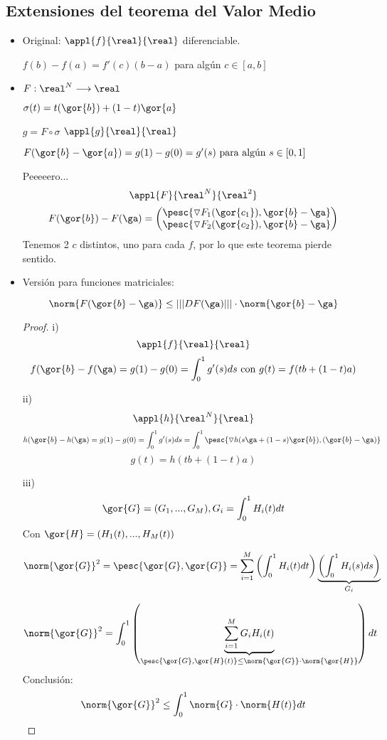 \documentclass[a4paper,10pt]{apuntes}
\begin{document}
\subsection{Extensiones del teorema del Valor Medio}
\begin{itemize}
 \item Original:
 $\appl{f}{\real}{\real}$ diferenciable. 
 
 $f(b)-f(a) = f'(c)(b-a)$ para algún $c\in[a,b]$
 
 \item
  
 $F : \real^N  \longrightarrow \real$
 
 $\sigma(t)  = t(\gor{b})+(1-t)\gor{a}$
 
 $g  = F\circ \sigma$
 $\appl{g}{\real }{\real}$
 
 $F(\gor{b}-\gor{a}) = g(1)-g(0)  = g'(s) \text{ para algún }s\in[0,1]$
 
  
  Peeeeero...
  $$\appl{F}{\real^N}{\real^2}$$
  $$F(\gor{b})-F(\ga) = \begin{pmatrix}
                         \pesc{\triangledown F_1(\gor{c_1}),{\gor{b}-\ga}}\\
                         \pesc{\triangledown F_2(\gor{c_2}),\gor{b}-\ga}
                        \end{pmatrix}
$$
  Tenemos 2 $c$ distintos, uno para cada $f$, por lo que este teorema pierde sentido.
  
  \item Versión para funciones matriciales:
  
  $$\norm{F(\gor{b}-\ga)} \leq |||DF(\ga)|||\cdot\norm{\gor{b}-\ga}$$
  
  \begin{proof}
   i) $$\appl{f}{\real}{\real}$$
   $$f(\gor{b}-f(\ga) = g(1)-g(0) = \int_0^1g'(s)ds \text{ con } g(t) = f(tb+(1-t)a)$$
   
   ii)  $$\appl{h}{\real^N}{\real}$$
   $$h(\gor{b}-h(\ga) = g(1)-g(0) = \int_0^1g'(s)ds = \int_0^1 \pesc{\triangledown h(s\ga+(1-s)\gor{b}),(\gor{b}-\ga)}$$
   $$g(t) = h(tb+(1-t)a)$$
   
   iii) $$\gor{G} = (G_1,...,G_M), G_i = \int_0^1H_i(t)dt$$
   Con $\gor{H} = (H_1(t),...,H_M(t))$
   
   
   $$\norm{\gor{G}}^2 = \pesc{\gor{G},\gor{G}} = \sum_{i=1}^M \left(\int_0^1 H_i(t)dt\right) \underbrace{\left(\int_0^1 H_i(s)ds\right)}_{G_i}$$
 
   $$\norm{\gor{G}}^2 = \displaystyle\int_0^1 \left(\underbrace{\sum_{i=1}^M G_i H_i (t)}_{\pesc{\gor{G},\gor{H}(t)}\leq \norm{\gor{G}}\cdot \norm{\gor{H}}}\right)dt$$
   Conclusión:
   $$\norm{\gor{G}}^2 \leq \displaystyle\int_0^1\norm{G}\cdot\norm{H(t)}dt$$
   

\end{proof}
\end{itemize}
\end{document}
